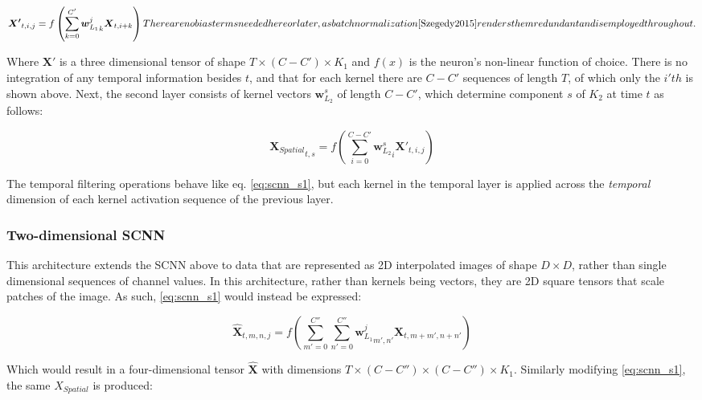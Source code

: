 \documentclass[utf8]{frontiersSCNS} %
\begin{document}
\begin{equation} \label{eq:scnn_s1}
  \boldsymbol{X'}_{t, i, j} = f\left(\sum_{k=0}^{C'} {\boldsymbol{w}_{L_1}^j}_k \boldsymbol{X}_{t,i+k}\right) \footnote{There are no bias terms needed here or later, as batch normalization \cite{Szegedy2015} renders them redundant and is employed throughout.}
\end{equation}

Where $\boldsymbol{X'}$ is a three dimensional tensor of shape $T \times (C-C') \times K_1$ and $f(x)$ is the neuron's non-linear function of choice. There is no integration of any temporal information besides $t$, and that for each kernel there are $C-C'$ sequences of length $T$, of which only the $i'{th}$ is shown above. Next, the second layer consists of kernel vectors $\boldsymbol{w}_{L_2}^s$ of length $C-C'$, which determine component $s$ of $K_2$ at time $t$ as follows:

\begin{equation} \label{eq:scnn_s2}
  {\boldsymbol{X}_{Spatial}}_{t, s} = f(\sum_{i=0}^{C-C'}{\boldsymbol{w}_{L_2}^s}_i \boldsymbol{X'}_{t, i, j})
\end{equation}

The temporal filtering operations behave like eq. \ref{eq:scnn_s1}, but each kernel in the temporal layer is applied across the {\em temporal} dimension of each kernel activation sequence of the previous layer.

\subsubsection{Two-dimensional SCNN}

This architecture extends the SCNN above to data that are represented as 2D interpolated images of shape $D \times D$, rather than single dimensional sequences of channel values. In this architecture, rather than kernels being vectors, they are 2D square tensors that scale patches of the image. As such, \ref{eq:scnn_s1} would instead be expressed:

\begin{equation} \label{eq:s2dcnn_s1}
  \boldsymbol{\hat{X}}_{t, m, n, j} = f(\sum_{m'=0}^{C''} \sum_{n'=0}^{C''} {\boldsymbol{w}_{L_1}^j}_{m', n'} \boldsymbol{X}_{t,m+m',n+n'})
\end{equation}

Which would result in a four-dimensional tensor $\boldsymbol{\hat{X}}$ with dimensions $T \times (C-C'') \times (C-C'') \times K_1$. Similarly modifying \ref{eq:scnn_s1}, the same $X_{Spatial}$ is produced:
\end{document}
